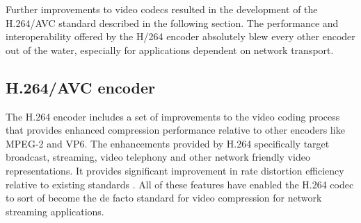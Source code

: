 \documentclass[letterpaper,12pt,titlepage,oneside,final]{report}
\begin{document}


                Further improvements to video codecs resulted in the development of the H.264/AVC standard described in the following section. The performance and interoperability offered by the H/264 encoder absolutely blew every other encoder out of the water, especially for applications dependent on network transport.

        \subsection{H.264/AVC encoder}
        \label{sub:H.264}
            The H.264 encoder includes a set of improvements to the video coding process that provides enhanced compression performance relative to other encoders like MPEG-2 and VP6. The enhancements provided by H.264 specifically target broadcast, streaming, video telephony and other network friendly video representations. It provides significant improvement in rate distortion efficiency relative to existing standards \cite{Wiegand2003}. All of these features have enabled the H.264 codec to sort of become the de facto standard for video compression for network streaming applications. 
\end{document}
